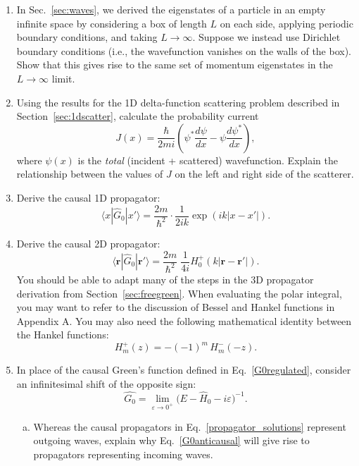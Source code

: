 \documentclass[prx,12pt]{revtex4-2}
\begin{document}
\begin{enumerate}
\item In Sec.~\ref{sec:waves}, we derived the eigenstates of a
  particle in an empty infinite space by considering a box of length
  $L$ on each side, applying periodic boundary conditions, and taking
  $L \rightarrow \infty$.  Suppose we instead use Dirichlet boundary
  conditions (i.e., the wavefunction vanishes on the walls of the
  box).  Show that this gives rise to the same set of momentum
  eigenstates in the $L \rightarrow \infty$ limit.

\item Using the results for the 1D delta-function scattering problem
  described in Section~\ref{sec:1dscatter}, calculate the probability
  current
  \begin{equation}
    J(x) = \frac{\hbar}{2mi}\left(\psi^*\frac{d\psi}{dx} - \psi\frac{d\psi^*}{dx}\right),
  \end{equation}
  where $\psi(x)$ is the \textit{total} (incident + scattered)
  wavefunction.  Explain the relationship between the values of $J$ on
  the left and right side of the scatterer.

\item \label{ex:1dpropagator}
  Derive the causal 1D propagator:
  \begin{equation}
    \langle x|\hat{G}_0|x'\rangle = \frac{2m}{\hbar^2} \cdot \frac{1}{2ik} \exp\left(ik|x-x'|\right).
  \end{equation}

\item \label{ex:2dpropagator}
  Derive the causal 2D propagator:
  \begin{equation}
    \langle\mathbf{r}|\hat{G}_0|\mathbf{r}'\rangle = \frac{2m}{\hbar^2}\;
    \frac{1}{4i} H^+_0(k|\mathbf{r}-\mathbf{r'}|).
  \end{equation}
  You should be able to adapt many of the steps in the 3D propagator
  derivation from Section~\ref{sec:freegreen}.  When evaluating the
  polar integral, you may want to refer to the discussion of Bessel
  and Hankel functions in Appendix A.  You may also need the following
  mathematical identity between the Hankel functions:
  \begin{equation}
    H_m^+(z) = - (-1)^m \, H_m^-(-z).
  \end{equation}
  
\item \label{ex:anticausal}
  In place of the causal Green's function defined in
  Eq.~\eqref{G0regulated}, consider an infinitesimal shift of the
  opposite sign:
  \begin{equation}
    \hat{G_0} = \lim_{\varepsilon\rightarrow 0^+} \big(E - \hat{H}_0 - i \varepsilon\big)^{-1}.
    \label{G0anticausal}
  \end{equation}
  \begin{enumerate}[(a)]
  \item 
  Whereas the causal propagators in Eq.~\eqref{propagator_solutions}
  represent outgoing waves, explain why Eq.~\eqref{G0anticausal} will
  give rise to propagators representing incoming waves.


\end{enumerate}
\end{enumerate}
\end{document}
